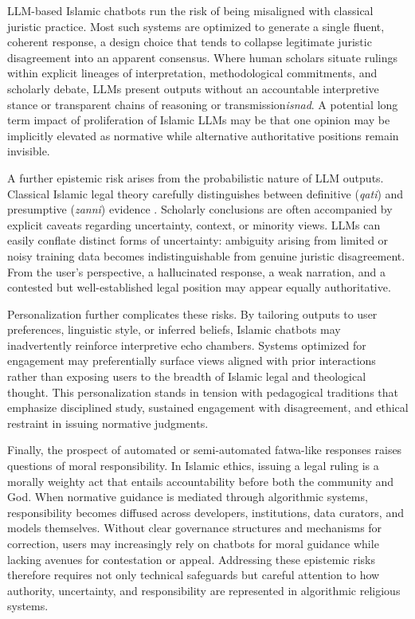 \documentclass{article}
\begin{document}
LLM-based Islamic chatbots run the risk of being misaligned with classical juristic practice. Most such systems are optimized to generate a single fluent, coherent response, a design choice that tends to collapse legitimate juristic disagreement into an apparent consensus. Where human scholars situate rulings within explicit lineages of interpretation, methodological commitments, and scholarly debate, LLMs present outputs without an accountable interpretive stance or transparent chains of reasoning or transmission\emph{isnad}. A potential long term impact of proliferation of Islamic LLMs may be that one opinion may be implicitly elevated as normative while alternative authoritative positions remain invisible.

A further epistemic risk arises from the probabilistic nature of LLM outputs. Classical Islamic legal theory carefully distinguishes between definitive (\emph{qati}) and presumptive (\emph{zanni}) evidence \citep{ramadan2006ijtihad}. Scholarly conclusions are often accompanied by explicit caveats regarding uncertainty, context, or minority views. LLMs can easily conflate distinct forms of uncertainty: ambiguity arising from limited or noisy training data becomes indistinguishable from genuine juristic disagreement. From the user's perspective, a hallucinated response, a weak narration, and a contested but well-established legal position may appear equally authoritative.

Personalization further complicates these risks. By tailoring outputs to user preferences, linguistic style, or inferred beliefs, Islamic chatbots may inadvertently reinforce interpretive echo chambers. Systems optimized for engagement may preferentially surface views aligned with prior interactions rather than exposing users to the breadth of Islamic legal and theological thought. This personalization stands in tension with pedagogical traditions that emphasize disciplined study, sustained engagement with disagreement, and ethical restraint in issuing normative judgments.

Finally, the prospect of automated or semi-automated fatwa-like responses raises questions of moral responsibility. In Islamic ethics, issuing a legal ruling is a morally weighty act that entails accountability before both the community and God. When normative guidance is mediated through algorithmic systems, responsibility becomes diffused across developers, institutions, data curators, and models themselves. Without clear governance structures and mechanisms for correction, users may increasingly rely on chatbots for moral guidance while lacking avenues for contestation or appeal. Addressing these epistemic risks therefore requires not only technical safeguards but careful attention to how authority, uncertainty, and responsibility are represented in algorithmic religious systems.
\end{document}
